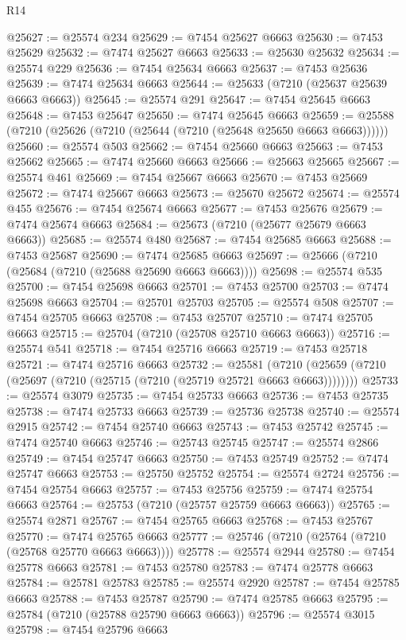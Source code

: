 \begin{lexlean}{R14}
\begin{coremodule}
@25627 := @25574 @234
@25629 := @7454 @25627 @6663
@25630 := @7453 @25629
@25632 := @7474 @25627 @6663
@25633 := @25630 @25632
@25634 := @25574 @229
@25636 := @7454 @25634 @6663
@25637 := @7453 @25636
@25639 := @7474 @25634 @6663
@25644 := @25633 (@7210 (@25637 @25639 @6663 @6663))
@25645 := @25574 @291
@25647 := @7454 @25645 @6663
@25648 := @7453 @25647
@25650 := @7474 @25645 @6663
@25659 := @25588 (@7210 (@25626 (@7210 (@25644 (@7210 (@25648 @25650 @6663 @6663))))))
@25660 := @25574 @503
@25662 := @7454 @25660 @6663
@25663 := @7453 @25662
@25665 := @7474 @25660 @6663
@25666 := @25663 @25665
@25667 := @25574 @461
@25669 := @7454 @25667 @6663
@25670 := @7453 @25669
@25672 := @7474 @25667 @6663
@25673 := @25670 @25672
@25674 := @25574 @455
@25676 := @7454 @25674 @6663
@25677 := @7453 @25676
@25679 := @7474 @25674 @6663
@25684 := @25673 (@7210 (@25677 @25679 @6663 @6663))
@25685 := @25574 @480
@25687 := @7454 @25685 @6663
@25688 := @7453 @25687
@25690 := @7474 @25685 @6663
@25697 := @25666 (@7210 (@25684 (@7210 (@25688 @25690 @6663 @6663))))
@25698 := @25574 @535
@25700 := @7454 @25698 @6663
@25701 := @7453 @25700
@25703 := @7474 @25698 @6663
@25704 := @25701 @25703
@25705 := @25574 @508
@25707 := @7454 @25705 @6663
@25708 := @7453 @25707
@25710 := @7474 @25705 @6663
@25715 := @25704 (@7210 (@25708 @25710 @6663 @6663))
@25716 := @25574 @541
@25718 := @7454 @25716 @6663
@25719 := @7453 @25718
@25721 := @7474 @25716 @6663
@25732 := @25581
    (@7210 (@25659 (@7210 (@25697 (@7210 (@25715 (@7210 (@25719 @25721 @6663 @6663))))))))
@25733 := @25574 @3079
@25735 := @7454 @25733 @6663
@25736 := @7453 @25735
@25738 := @7474 @25733 @6663
@25739 := @25736 @25738
@25740 := @25574 @2915
@25742 := @7454 @25740 @6663
@25743 := @7453 @25742
@25745 := @7474 @25740 @6663
@25746 := @25743 @25745
@25747 := @25574 @2866
@25749 := @7454 @25747 @6663
@25750 := @7453 @25749
@25752 := @7474 @25747 @6663
@25753 := @25750 @25752
@25754 := @25574 @2724
@25756 := @7454 @25754 @6663
@25757 := @7453 @25756
@25759 := @7474 @25754 @6663
@25764 := @25753 (@7210 (@25757 @25759 @6663 @6663))
@25765 := @25574 @2871
@25767 := @7454 @25765 @6663
@25768 := @7453 @25767
@25770 := @7474 @25765 @6663
@25777 := @25746 (@7210 (@25764 (@7210 (@25768 @25770 @6663 @6663))))
@25778 := @25574 @2944
@25780 := @7454 @25778 @6663
@25781 := @7453 @25780
@25783 := @7474 @25778 @6663
@25784 := @25781 @25783
@25785 := @25574 @2920
@25787 := @7454 @25785 @6663
@25788 := @7453 @25787
@25790 := @7474 @25785 @6663
@25795 := @25784 (@7210 (@25788 @25790 @6663 @6663))
@25796 := @25574 @3015
@25798 := @7454 @25796 @6663

\end{coremodule}
\end{lexlean}

